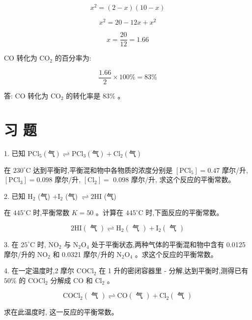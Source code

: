\documentclass[10pt]{article}
\begin{document}
\[
{x}^{2} = \left( {2 - x}\right) \left( {{10} - x}\right)
\]

\[
{x}^{2} = {20} - {12x} + {x}^{2}
\]

\[
x = \frac{20}{12} = {1.66}
\]

\(\mathrm{{CO}}\) 转化为 \({\mathrm{{CO}}}_{2}\) 的百分率为:

\[
\frac{1.66}{2} \times {100}\% = {83}\%
\]

答: \(\mathrm{{CO}}\) 转化为 \({\mathrm{{CO}}}_{2}\) 的转化率是 \({83}\%\) 。

\section*{习 题}

1. 已知 \({\mathrm{{PCl}}}_{5}\left( \text{气}\right) \rightleftharpoons {\mathrm{{PCl}}}_{3}\left( \text{气}\right) + {\mathrm{{Cl}}}_{2}\left( \text{气}\right)\)

在 \({230}^{ \circ }\mathrm{C}\) 达到平衡时,平衡混和物中各物质的浓度分别是 \(\left\lbrack {\mathrm{{PCl}}}_{5}\right\rbrack = {0.47}\) 摩尔/升, \(\left\lbrack {\mathrm{{PCl}}}_{3}\right\rbrack = {0.098}\) 摩尔/升, \(\left\lbrack {\mathrm{{Cl}}}_{2}\right\rbrack =\) 0.098 摩尔/升, 求这个反应的平衡常数。

2. 已知 \({\mathrm{H}}_{2}\) (气) \(+ {\mathrm{I}}_{2}\) (气) \(\rightleftharpoons 2\mathrm{{HI}}\) (气)

在 \({445}^{ \circ }\mathrm{C}\) 时,平衡常数 \(K = {50}\) 。计算在 \({445}^{ \circ }\mathrm{C}\) 时,下面反应的平衡常数。

\[
2\mathrm{{HI}}\left( \text{ 气 }\right) \rightleftharpoons {\mathrm{H}}_{2}\left( \text{ 气 }\right) + {\mathrm{I}}_{2}\left( \text{ 气 }\right)
\]

3. 在 \({25}^{ \circ }\mathrm{C}\) 时, \({\mathrm{{NO}}}_{2}\) 与 \({\mathrm{N}}_{2}{\mathrm{O}}_{4}\) 处于平衡状态,两种气体的平衡混和物中含有 0.0125 摩尔/升的 \({\mathrm{{NO}}}_{2}\) 和 0.0321 摩尔/升的 \({\mathrm{N}}_{2}{\mathrm{O}}_{4}\) 。求这个反应的平衡常数。

4. 在一定温度时,2 摩尔 \({\mathrm{{COCl}}}_{2}\) 在 1 升的密闭容器里 - 分解,达到平衡时,测得已有 \({50}\%\) 的 \({\mathrm{{COCl}}}_{2}\) 分解成 \(\mathrm{{CO}}\) 和 \({\mathrm{{Cl}}}_{2}\) 。

\[
{\mathrm{{COCl}}}_{2}\left( \text{ 气 }\right) \rightleftharpoons \mathrm{{CO}}\left( \text{ 气 }\right) + {\mathrm{{Cl}}}_{2}\left( \text{ 气 }\right)
\]

求在此温度时, 这一反应的平衡常数。
\end{document}
